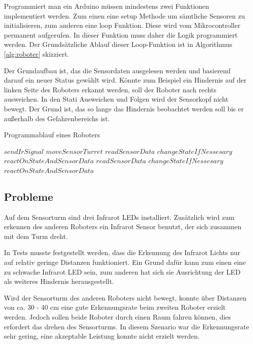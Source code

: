 \documentclass[12pt,a4paper,titlepage]{article}
\begin{document}
Programmiert man ein Arduino müssen mindestens zwei Funktionen implementiert werden. Zum einen eine setup Methode um sämtliche Sensoren zu initialisieren, zum anderen eine loop Funktion. Diese wird vom Mikrocontroller permanent aufgerufen. In dieser Funktion muss daher die Logik programmiert werden. Der Grundsätzliche Ablauf dieser Loop-Funktion ist in Algorithmus \ref{alg:roboter} skizziert.

Der Grundaufbau ist, das die Sensordaten ausgelesen werden und basierend darauf ein neuer Status gewählt wird. Könnte zum Beispiel ein Hindernis auf der linken Seite des Roboters erkannt werden, soll der Roboter nach rechts ausweichen. In den Stati Ausweichen und Folgen wird der Sensorkopf nicht bewegt. Der Grund ist, das so lange das Hindernis beobachtet werden soll bis er außerhalb des Gefahrenbereichs ist.

\begin{algorithm}
\caption{Programmablauf eines Roboters}
\label{alg:roboter}
\begin{algorithmic}
\STATE $sendIrSignal$
    \STATE $moveSensorTurret$
    \STATE $readSensorData$
    \STATE $changeStateIfNessesary$
    \STATE $reactOnStateAndSensorData$
    \STATE $readSensorData$
    \STATE $changeStateIfNessesary$
    \STATE $reactOnStateAndSensorData$
\ENDIF
\end{algorithmic}
\end{algorithm}

\subsection{Probleme}

Auf dem Sensorturm sind drei Infrarot LEDs installiert. Zusätzlich wird zum erkennen des anderen Roboters ein Infrarot Sensor benutzt, der sich zusammen mit dem Turm dreht.

In Tests musste festgestellt werden, dass die Erkennung des Infrarot Lichts nur auf relativ geringe Distanzen funktioniert. Ein Grund dafür kann zum einen eine zu schwache Infrarot LED sein, zum anderen hat sich sie Ausrichtung der LED als weiteres Hindernis herausgestellt.

Wird der Sensorturm des anderen Roboters nicht bewegt, konnte über Distanzen von ca. 30 - 40 cm eine gute Erkennungsrate beim zweiten Roboter erzielt werden. Jedoch sollen beide Roboter durch einen Raum fahren können, dies erfordert das drehen des Sensorturms. In diesem Szenario war die Erkennungsrate sehr gering, eine akzeptable Leistung konnte nicht erzielt werden.
\end{document}
